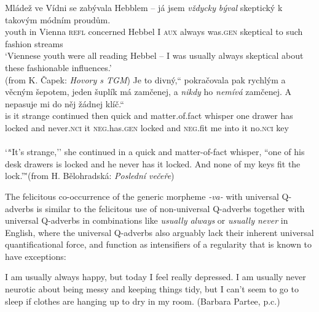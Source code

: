 \documentclass[output=paper,colorlinks,citecolor=brown]{langscibook}
\begin{document}
\ea
\ea \label{capek} \gll Mládež ve Vídni se zabývala Hebblem -- já jsem \textit{vždycky} \textit{býval} skeptický k takovým módním proudům.\\
youth in Vienna \textsc{refl} concerned Hebbel {} I \textsc{aux} always was.\textsc{gen} skeptical to such fashion streams\\
\glt `Viennese youth were all reading Hebbel -- I was usually always skeptical about these fashionable influences.'\\\hfill (from K. Čapek: \textit{Hovory s TGM})
\ex	\label{suplik} \gll {} Je to divný,“ pokračovala pak rychlým a věcným šepotem,  jeden šuplík má zamčenej, a \textit{nikdy} ho \textit{nemívá} zamčenej. A nepasuje mi do něj žádnej klíč.“\\
{} is it strange continued then quick and matter.of.fact whisper {} one drawer has locked and never.\textsc{nci} it \textsc{neg}.has.\textsc{gen} locked and \textsc{neg}.fit me into it no.\textsc{nci} key\\
\\
\glt `\.{“}It’s strange,'' she continued in a quick and matter-of-fact whisper, ``one of his desk drawers is locked and he never has it locked. And none of my keys fit the lock.''\.'\hfill (from H. Bělohradská: \textit{Poslední večeře})
\z
\z

\noindent The felicitous co-occurrence of
the  generic morpheme \textit{-va-} with universal Q-adverbs
is similar to the felicitous use of non-universal Q-adverbs together with universal Q-adverbs in combinations like \textit{usually always} or \textit{usually never} in English, where the universal Q-adverbs also arguably lack their inherent universal quantificational force,
and function as intensifiers of a regularity that is known to have exceptions:

\ea
\ea I am usually always happy, but today I feel really depressed.
\ex I am usually never neurotic about being messy and keeping things tidy, but I can't seem to go to sleep if clothes are hanging up to dry in my room. \hfill (Barbara Partee, p.c.)
\z
\z
\end{document}

